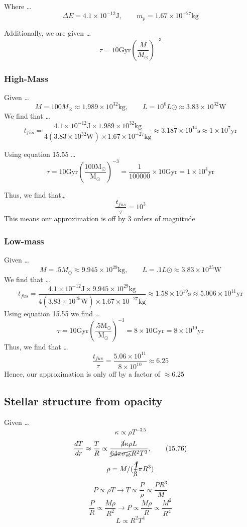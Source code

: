 \documentclass{article}
\begin{document}
Where \dots
    \[\Delta E = 4.1 \times 10^{-12} \text{J}, \qquad m_p = 1.67 \times 10^{-27} \text{kg}\]

Additionally, we are given \dots
\begin{equation}
    \tau = 10 \text{Gyr}\left(\frac{M}{M_\odot}\right)^{-3}
    \tag{15.55}
\end{equation}

\subsubsection{High-Mass}
Given \dots
    \[M = 100 M_\odot \approx 1.989 \times 10^{32} \text{kg}, \qquad  L = 10^6 L\odot \approx 3.83 \times 10^{32} \text{W}\]
We find that \dots
    \[t_{fus} = \frac{4.1 \times 10^{-12} \text{J} \times 1.989 \times 10^{32} \text{kg}}{4(3.83 \times 10^{32} \text{W})\times 1.67 \times 10^{-27} \text{kg}} \boxed{\approx 3.187 \times 10^{14} \text{s} \approx 1 \times 10^7 \text{yr}}\]

Using equation 15.55 \dots
    \[\tau = 10 \text{Gyr}\left(\frac{\text{100}\text{M}_\odot}{\text{M}_\odot}\right)^{-3} = \frac{1}{100000} \times 10\text{Gyr} = \boxed{1  \times 10^4\text{yr}} \]

Thus, we find that\dots
    \[\frac{t_{fus}}{\tau} \boxed{= 10^3}\]
This means our approximation is off by 3 orders of magnitude 

\subsubsection{Low-mass}
Given \dots
    \[M = .5 M_\odot \approx 9.945 \times 10^{29} \text{kg}, \qquad  L = .1 L\odot \approx 3.83 \times 10^{25} \text{W}\]
We find that \dots
    \[t_{fus} = \frac{4.1 \times 10^{-12} \text{J} \times 9.945 \times 10^{29} \text{kg}}{4(3.83 \times 10^{25} \text{W})\times 1.67 \times 10^{-27} \text{kg}} \approx \boxed{1.58 \times 10^{19} \text{s} \approx 5.006 \times 10^{11} \text{yr}}\]
Using equation 15.55 we find \dots
    \[\tau = 10\text{Gyr}\left(\frac{.5\text{M}_\odot}{\text{M}_\odot}\right)^{-3} = 8 \times 10 \text{Gyr} = \boxed{8\times 10^{10}\text{yr}}\]
Thus, we find that \dots
    \[\frac{t_{fus}}{\tau} = \frac{5.06 \times 10^{11}}{8 \times 10^{10}} \boxed{\approx 6.25}\]
Hence, our approximation is only off by a factor of \(\approx 6.25\) 
    

\subsection{Stellar structure from opacity}
Given \dots
\[\kappa \propto \rho T^{-3.5}\]
\[\frac{dT}{dr} \approx \frac{T}{R}  \propto \frac{\cancel{3}\kappa \rho L}{\cancel{64\pi \sigma_{sb}}R^2 T^3}, \qquad (15.76)\]
\[\rho = M / (\cancel{\frac{4}{3}}\pi R^3)\]
\[P \propto \rho T \rightarrow T \propto \frac{P}{\rho} \propto \frac{PR^3}{M}\]
\[\frac{P}{R} \propto \frac{M\rho}{R^2} \rightarrow P \propto \frac{M\rho}{R} \propto \frac{M^2}{R^4}\]
\[L \propto R^2T^4 \]
\end{document}
